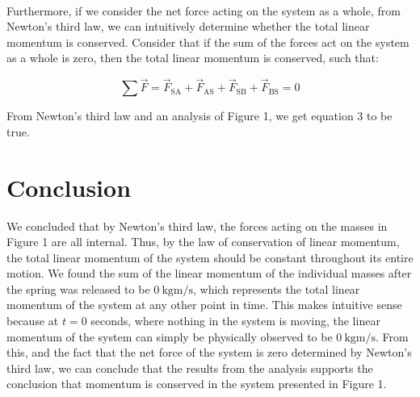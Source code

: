 \documentclass[12pt]{article}
\begin{document}
\paragraph{}

Furthermore, if we consider the net force acting on the system as a whole, from Newton's third law, we can intuitively determine whether the total linear momentum is conserved. Consider that if the sum of the forces act on the system as a whole is zero, then the total linear momentum is conserved, such that:

\begin{equation}
    \sum{}{}\vec{F} = \vec{F}_\text{SA} + \vec{F}_\text{AS} + \vec{F}_\text{SB} + \vec{F}_\text{BS} = 0
\end{equation}

From Newton's third law and an analysis of Figure 1,  we get equation 3 to be true.

\section{Conclusion}
We concluded that by Newton's third law, the forces acting on the masses in Figure 1 are all internal. Thus, by the law of conservation of linear momentum, the total linear momentum of the system should be constant throughout its entire motion. We found the sum of the linear momentum of the individual masses after the spring was released to be $\SI{0}{\kilogram\metre\per\second}$, which represents the total linear momentum of the system at any other point in time. This makes intuitive sense because at $t = 0$ seconds, where nothing in the system is moving, the linear momentum of the system can simply be physically observed to be $\SI{0}{\kilogram\metre\per\second}$. From this, and the fact that the net force of the system is zero determined by Newton's third law, we can conclude that the results from the analysis supports the conclusion that momentum is conserved in the system presented in Figure 1.
\end{document}
